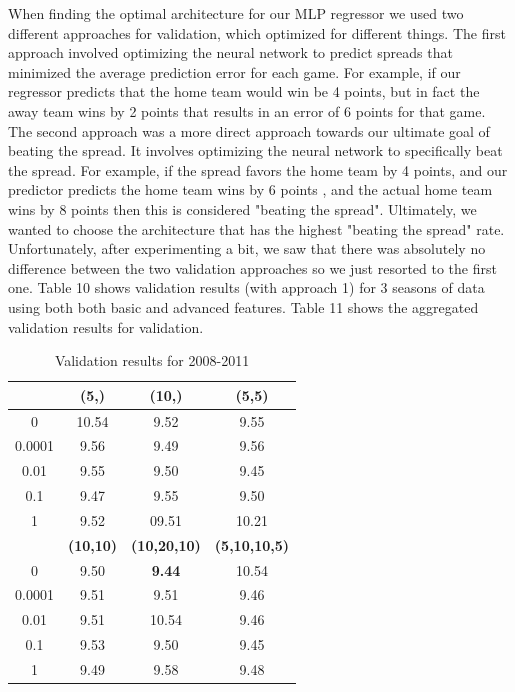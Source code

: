 \documentclass{article}
\begin{document}
When finding the optimal architecture for our MLP regressor we used two different approaches for validation, which optimized for different things. The first approach involved optimizing the neural network to predict spreads that minimized the average prediction error for each game. For example, if our regressor predicts that the home team would win be 4 points, but in fact the away team wins by 2 points that results in an error of 6 points for that game. The second approach was a more direct approach towards our ultimate goal of beating the spread. It involves optimizing the neural network to specifically beat the spread. For example, if the spread favors the home team by 4 points, and our predictor predicts the home team wins by 6 points , and the actual home team wins by 8 points then this is considered "beating the spread". Ultimately, we wanted to choose the architecture that has the highest "beating the spread" rate. Unfortunately, after experimenting a bit, we saw that there was absolutely no difference between the two validation approaches so we just resorted to the first one. Table 10 shows validation results (with approach 1) for 3 seasons of data using both both basic and advanced features. Table 11 shows the aggregated validation results for validation.
\begin{table}
  \begin{center}
    \begin{tabular}{ | c | c | c | c |}
      \hline

            &             	\textbf{(5,)} & 	\textbf{(10,)} & 	\textbf{(5,5)}   	 \\ \hline
	0  &     	10.54 & 	9.52&	9.55	  \\ \hline
	0.0001 &   9.56 &     	9.49&	9.56 \\ \hline	
	0.01  &    	9.55 &     	9.50& 	9.45    \\ \hline	
	0.1	&	9.47&	9.55 &	9.50  \\ \hline
	1	&	9.52 &	09.51&	 10.21\\ \hline
		&	\textbf{(10,10)} & 	\textbf{(10,20,10)} & 	\textbf{(5,10,10,5)}  \\ \hline
		0&	9.50&	\textbf{9.44}&	10.54	    \\ \hline
		0.0001& 9.51&		9.51&	9.46	    \\ \hline	
		0.01 & 9.51&	10.54&		9.46	    \\ \hline	
		0.1 & 9.53&	9.50&		9.45	    \\ \hline
		1 & 9.49&	9.58&		9.48	    \\ \hline



    \end{tabular}
  \end{center}
  \caption{Validation results for 2008-2011}
\end{table}
\end{document}
